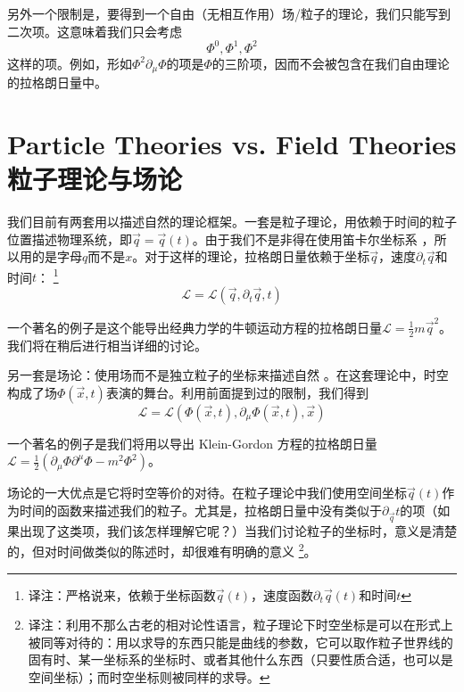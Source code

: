 另外一个限制是，要得到一个自由（无相互作用）场/粒子的理论，我们只能写到二次项。这意味着我们只会考虑%
\[
\Phi^0, \Phi^1, \Phi^2
\]
这样的项。例如，形如\(\Phi^2 \partial_\mu \Phi\)的项是\(\Phi\)的三阶项，因而不会被包含在我们自由理论的拉格朗日量中。

\section[粒子理论与场论]{Particle Theories vs. Field Theories 粒子理论与场论}\label{sec4.3}
我们目前有两套用以描述自然的理论框架。一套是粒子理论，用依赖于时间的粒子位置描述物理系统，即\(\vec{q}=\vec{q}(t)\)。由于我们不是非得在使用笛卡尔坐标系%
%
，所以用的是字母\(q\)而不是\(x\)。对于这样的理论，拉格朗日量依赖于坐标\(\vec{q}\)，速度\(\partial_t\vec{q}\)和时间\(t\)：%
\footnote{译注：严格说来，依赖于坐标函数\(\vec{q}(t)\)，速度函数\(\partial_t\vec{q}(t)\)和时间\(t\)}
\begin{equation}
{\mathcal L} = {\mathcal L} (\vec{q},\partial_t\vec{q},t)
\end{equation}

一个著名的例子是这个能导出经典力学的牛顿运动方程的拉格朗日量\({\mathcal L} = \frac{1}{2}m\vec{q}^2\)。我们将在稍后进行相当详细的讨论。

另一套是场论：使用场而不是独立粒子的坐标来描述自然%
%
。在这套理论中，时空构成了场\(\Phi(\vec{x},t)\)表演的舞台。利用前面提到过的限制，我们得到%
\begin{equation}
{\mathscr L} = {\mathscr L} (\Phi(\vec{x},t), \partial_\mu \Phi(\vec{x},t), \vec{x})
\end{equation}

一个著名的例子是我们将用以导出 Klein-Gordon 方程的拉格朗日量\({\mathscr L} = \frac{1}{2}\left(\partial_\mu\Phi\partial^\mu\Phi-m^2\Phi^2\right)\)。

场论的一大优点是它将时空等价的对待。在粒子理论中我们使用空间坐标\(\vec{q}(t)\)作为时间的函数来描述我们的粒子。尤其是，拉格朗日量中没有类似于\(\partial_{\vec{q}}t\)的项（如果出现了这类项，我们该怎样理解它呢？）当我们讨论粒子的坐标时，意义是清楚的，但对时间做类似的陈述时，却很难有明确的意义%
\footnote{译注：利用不那么古老的相对论性语言，粒子理论下时空坐标是可以在形式上被同等对待的：用以求导的东西只能是曲线的参数，它可以取作粒子世界线的固有时、某一坐标系的坐标时、或者其他什么东西（只要性质合适，也可以是空间坐标）；而时空坐标则被同样的求导。}。

